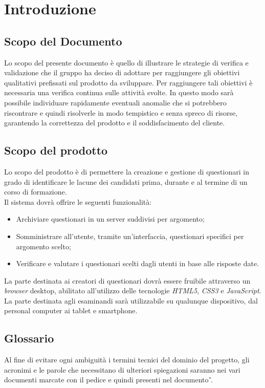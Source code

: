 \newpage
\section{Introduzione}
\subsection{Scopo del Documento}
Lo scopo del presente documento è quello di illustrare le strategie di verifica e validazione che il gruppo \gruppo \hspace{1mm} ha deciso di adottare per raggiungere gli obiettivi qualitativi prefissati sul prodotto da sviluppare. Per raggiungere tali obiettivi è necessaria una verifica continua sulle attività svolte. In questo modo sarà possibile individuare rapidamente eventuali anomalie che si potrebbero riscontrare e quindi risolverle in modo tempistico e senza spreco di risorse, garantendo la correttezza del prodotto e il soddisfacimento del cliente.

\subsection{Scopo del prodotto}
Lo scopo del prodotto è di permettere la creazione e gestione di questionari in grado di identificare le lacune dei candidati prima, durante e al termine di un corso di formazione. 
\\Il sistema dovrà offrire le seguenti funzionalità:
\begin{itemize}
	\item
	Archiviare questionari in un server suddivisi per argomento;
	\item
	Somministrare all'utente, tramite un'interfaccia, questionari specifici per argomento scelto;
	\item
	Verificare e valutare i questionari scelti dagli utenti in base alle risposte date.
\end{itemize}
La parte destinata ai creatori di questionari dovrà essere fruibile attraverso un \textit{browser} desktop, abilitato all'utilizzo delle tecnologie \textit{HTML5}, \textit{CSS3} e \textit{JavaScript}. La parte destinata agli esaminandi sarà utilizzabile su qualunque dispositivo, dal personal computer ai tablet e smartphone.

\subsection{Glossario}
Al fine di evitare ogni ambiguità i termini tecnici del dominio del progetto, gli acronimi e le parole che necessitano di ulteriori spiegazioni saranno nei vari documenti marcate con il pedice  e quindi presenti nel documento \textit{\G}.
